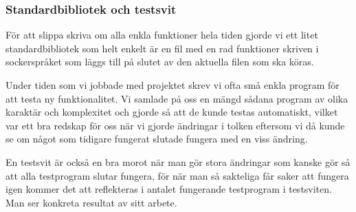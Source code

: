 \documentclass[../Appendix]{subfiles}
\begin{document}
\subsubsection{Standardbibliotek och testsvit}

För att slippa skriva om alla enkla funktioner hela tiden gjorde vi ett litet standardbibliotek
som helt enkelt är en fil med en rad funktioner skriven i sockerspråket som läggs
till på slutet av den aktuella filen som ska köras.

Under tiden som vi jobbade med projektet skrev vi ofta små enkla
program för att testa ny funktionalitet. Vi samlade på oss en mängd sådana program av
olika karaktär och komplexitet och gjorde så att de kunde testas automatiskt, 
vilket var ett bra redskap för oss 
när vi gjorde ändringar i tolken eftersom vi då kunde se om något som tidigare
fungerat slutade fungera med en viss ändring. 

En testsvit är också en bra morot när man gör stora ändringar som kanske gör så att
alla testprogram slutar fungera, för när man så sakteliga får saker att fungera
igen kommer det att reflekteras i antalet fungerande testprogram i testsviten. 
Man ser konkreta resultat av sitt arbete.



\end{document}
